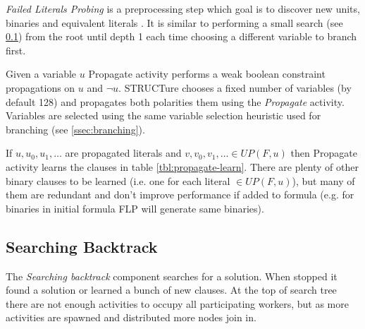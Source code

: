 \emph{Failed Literals Probing} is a preprocessing step
which goal is to discover new units, binaries
and equivalent literals \cite{Lynce03probing-basedpreprocessing}.
It is similar to performing a small search (see \ref{ssec:searching-tree})
from the root until depth 1 each time choosing a different variable to branch first.

Given a variable $u$ Propagate activity performs a weak boolean
constraint propagations on $u$ and $\neg u$.  STRUCTure chooses
a fixed number of variables (by default 128) and propagates both
polarities them using the \emph{Propagate} activity.  Variables are
selected using the same variable selection heuristic used for
branching (see \ref{ssec:branching}).

If $u, u_0, u_1, \ldots$ are propagated literals and $v, v_0, v_1,
\ldots \in UP(F, u)$ then Propagate activity learns the clauses in
table \ref{tbl:propagate-learn}. There are plenty of other binary
clauses to be learned (i.e. one for each literal $\in UP(F, u)$),
but many of them are redundant and don't improve performance if
added to formula (e.g. for binaries in initial formula FLP will
generate same binaries).

\begin{table}[h]
  \centering
  \caption{Learned units and binaries by Propagate activity}
  \label{tbl:propagate-learn}
\end{table}


\subsection{Searching Backtrack}
\label{ssec:searching-tree}

The \emph{Searching backtrack} component searches for a solution.
When stopped it found a solution or learned a bunch of new clauses.
At the top of search tree there are not enough activities to occupy
all participating workers, but as more activities are spawned and
distributed more nodes join in.

